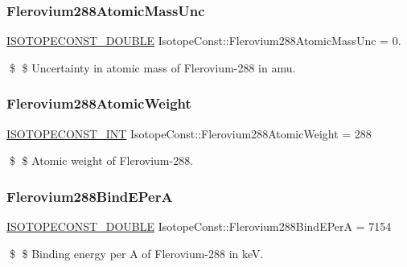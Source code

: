 \subsubsection{\texorpdfstring{Flerovium288\+Atomic\+Mass\+Unc}{Flerovium288AtomicMassUnc}}
{\footnotesize\ttfamily \mbox{\hyperlink{group___isotope_const-_macros_ga8f45a7272ce02c0b4c65c44636ed719a}{I\+S\+O\+T\+O\+P\+E\+C\+O\+N\+S\+T\+\_\+\+D\+O\+U\+B\+LE}} Isotope\+Const\+::\+Flerovium288\+Atomic\+Mass\+Unc = 0.}

\$ \$ Uncertainty in atomic mass of Flerovium-\/288 in amu. \mbox{\label{group___isotope_const-_flerovium-_fl288_ga4c4608a7279cf277d6902cf43d47ae52}} 
\subsubsection{\texorpdfstring{Flerovium288\+Atomic\+Weight}{Flerovium288AtomicWeight}}
{\footnotesize\ttfamily \mbox{\hyperlink{group___isotope_const-_macros_ga5f18360b3e99483a35c32d789e62621c}{I\+S\+O\+T\+O\+P\+E\+C\+O\+N\+S\+T\+\_\+\+I\+NT}} Isotope\+Const\+::\+Flerovium288\+Atomic\+Weight = 288}

\$ \$ Atomic weight of Flerovium-\/288. \mbox{\label{group___isotope_const-_flerovium-_fl288_ga27b60cec37f4c81534d96e74b6d0e237}} 
\subsubsection{\texorpdfstring{Flerovium288\+Bind\+E\+PerA}{Flerovium288BindEPerA}}
{\footnotesize\ttfamily \mbox{\hyperlink{group___isotope_const-_macros_ga8f45a7272ce02c0b4c65c44636ed719a}{I\+S\+O\+T\+O\+P\+E\+C\+O\+N\+S\+T\+\_\+\+D\+O\+U\+B\+LE}} Isotope\+Const\+::\+Flerovium288\+Bind\+E\+PerA = 7154}

\$ \$ Binding energy per A of Flerovium-\/288 in keV. \mbox{\label{group___isotope_const-_flerovium-_fl288_ga128c6b190ba4b7621e46eb5094ed1b0e}} 
